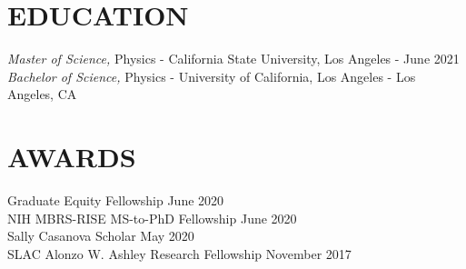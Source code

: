 \documentclass[margin,line]{res}
\begin{document}
\begin{resume}
%

\iffalse
\section{OBJECTIVE}
To pursue a Physics PhD in Quantum Information and Computing.
\fi

\section{EDUCATION}
{\sl Master of Science,} Physics - California State University, Los Angeles - June 2021
\\
{\sl Bachelor of Science,} Physics - University of California, Los Angeles - Los Angeles, CA

\section{AWARDS}  
Graduate Equity Fellowship \hfill June 2020 \\
NIH MBRS-RISE MS-to-PhD Fellowship \hfill June 2020 \\
Sally Casanova Scholar \hfill May 2020 \\
SLAC Alonzo W. Ashley Research Fellowship \hfill November 2017 \\


\end{resume}
\end{document}
